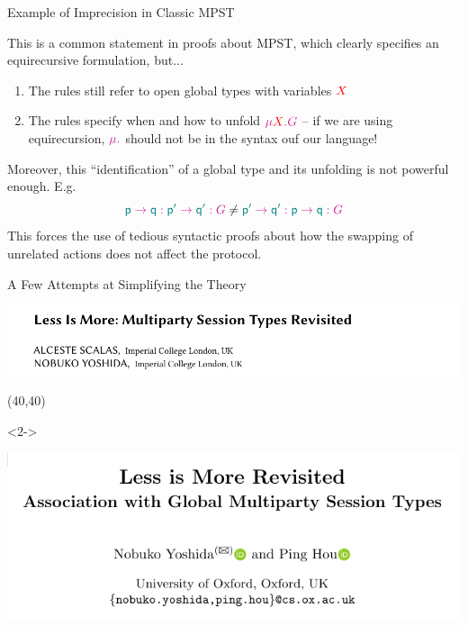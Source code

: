 \begin{frame}{Example of Imprecision in Classic MPST}

  \vspace{.4cm}

  This is a common statement in proofs about MPST, which clearly specifies an equirecursive formulation, but...
  \begin{enumerate}
    \item The rules still refer to open global types with variables $\pvar{X}$
    \item The rules specify when and how to unfold $\grecur X G$ -- if we are using equirecursion, $\grecur{}{}$ should not be in the syntax ouf our language!
  \end{enumerate}

  \vspace{.4cm}
  Moreover, this ``identification'' of a global type and its unfolding is not powerful enough. E.g.
  \[
    \gmsg \Rp \Rq {\gmsg {\Rp'} {\Rq'} G} \neq \gmsg {\Rp'} {\Rq'} {\gmsg \Rp \Rq G}
  \]
  This forces the use of tedious syntactic proofs about how the swapping of unrelated actions does not affect the protocol.
\end{frame}

\begin{frame}{A Few Attempts at Simplifying the Theory}

    \begin{minipage}{.86\columnwidth}
    \begin{sticky}
  \includegraphics[width=\textwidth]{figures/less-is-more.pdf}
    \end{sticky}
    \end{minipage}

  \Put(40,40){%
    \begin{onlyenv}<2->
    \begin{minipage}{.86\columnwidth}
    \begin{sticky}
  \includegraphics[width=\textwidth]{figures/less-is-more-revisite.pdf}
    \end{sticky}
    \end{minipage}
    \end{onlyenv}
   }

\end{frame}

